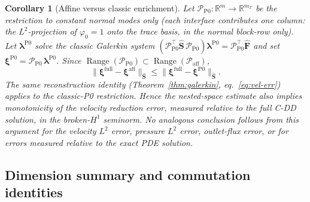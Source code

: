 \documentclass[11pt,a4paper]{article}
\newtheorem{corollary}[assumption]{Corollary}
\newcommand{\R}{\mathbb{R}}
\newcommand{\trac}{\bm{\lambda}}
\newcommand{\Schur}{\mathbf{S}}
\newcommand{\Range}{\operatorname{Range}}
\begin{document}
\begin{corollary}[Affine versus classic enrichment]\label{cor:enrich}
  Let $\mathcal{P}_{\text{P0}} : \R^m \to \R^{m_\Gamma}$ be the restriction
  to constant normal modes only (each interface contributes one column:
  the $L^2$-projection of $\varphi_0=1$ onto the trace basis, in the
  normal block-row only).
  Let $\trac^{\text{P0}}$ solve the classic Galerkin system
  $(\mathcal{P}_{\text{P0}}^\top \widehat{\Schur}\,\mathcal{P}_{\text{P0}})
   \trac^{\text{P0}} = \mathcal{P}_{\text{P0}}^\top \widehat{\bm{F}}$
  and set $\bm{\xi}^{\text{P0}} = \mathcal{P}_{\text{P0}}\,
  \trac^{\text{P0}}$.
  Since
  $\Range(\mathcal{P}_{\text{P0}}) \subset \Range(\mathcal{P}_{\text{aff}})$,
  \begin{equation}\label{eq:enrich}
    \|\bm{\xi}^{\text{full}} - \bm{\xi}^{\text{aff}}\|_{\widehat{\Schur}}
    \le \|\bm{\xi}^{\text{full}}
      - \bm{\xi}^{\text{P0}}\|_{\widehat{\Schur}}.
  \end{equation}
  The same reconstruction identity (Theorem~\ref{thm:galerkin},
  eq.~\eqref{eq:vel-err}) applies to the classic-P0 restriction.
  Hence the nested-space estimate also implies monotonicity of the
  velocity reduction error, measured relative to the full C-DD
  solution, in the broken-$H^1$ seminorm.  No analogous conclusion
  follows from this argument for the velocity $L^2$ error, pressure
  $L^2$ error, outlet-flux error, or for errors measured relative
  to the exact PDE solution.
\end{corollary}

\subsection{Dimension summary and commutation identities}
\end{document}
